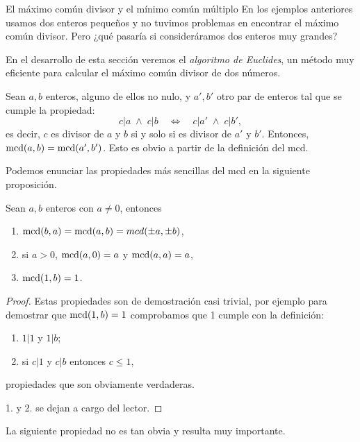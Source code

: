 \begin{section}{El máximo común divisor y el mínimo común múltiplo}
En los  ejemplos anteriores usamos dos enteros pequeños y no tuvimos problemas en encontrar el  máximo común divisor. Pero ¿qué pasaría si consideráramos dos enteros muy grandes? 

En  el desarrollo de esta sección veremos el \textit{algoritmo de Euclides}, un método muy eficiente para calcular el máximo común divisor de dos números. 


\begin{observacion}\label{obs-mcd-divisores} Sean $a,b$ enteros,  alguno de ellos  no nulo, y $a', b'$ otro par de enteros tal que se cumple la propiedad:
    $$
    c |a \; \wedge\;  c| b \quad \Leftrightarrow \quad  c |a' \; \wedge\;  c| b', 
    $$
    es decir, $c$  es divisor de $a$ y $b$ si y solo si es divisor de $a'$ y $b'$. Entonces,  $\operatorname{mcd}(a,b) = \operatorname{mcd}(a',b')$. Esto es obvio a partir de la definición del mcd.
    
\end{observacion}

Podemos enunciar las propiedades más sencillas del mcd en la siguiente proposición.

\begin{proposicion} Sean $a,b$ enteros con $a \not = 0$, entonces
    \begin{enumerate}
        \item $\operatorname{mcd}(b,a) = \operatorname{mcd}(a,b) = mcd(\pm a, \pm b)$,
        \item si $a>0$,  $\operatorname{mcd}(a,0) = a$ y $\operatorname{mcd}(a,a) = a$,
        \item $\operatorname{mcd}(1,b) = 1$.
    \end{enumerate}
\end{proposicion}
\begin{proof}
    Estas propiedades son de demostración casi trivial, por ejemplo para demostrar que  $\operatorname{mcd}(1,b) = 1$ comprobamos que 1 cumple con la definición:
    \begin{enumerate}[label=\textit{\alph*)}]
        \item $ 1|1$ y $1|b$;
        \item si $ c|1 $ y $c|b$ entonces $ c \le 1$,
    \end{enumerate}
    propiedades que son obviamente verdaderas.
    
    1. y 2.  se dejan a cargo del lector. 
\end{proof}

La siguiente propiedad no es tan obvia y resulta muy importante. 


\end{section}
